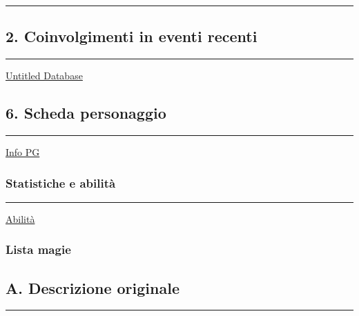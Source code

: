 \begin{center}\rule{0.5\linewidth}{0.5pt}\end{center}

\subsection{2. Coinvolgimenti in eventi
recenti}\label{coinvolgimenti-in-eventi-recenti}

\begin{center}\rule{0.5\linewidth}{0.5pt}\end{center}

\href{Untitled\%20Database\%20f0a0837cffd44ac7a9471133f60c97b8.csv}{Untitled
Database}

\subsection{6. Scheda personaggio}\label{scheda-personaggio}

\begin{center}\rule{0.5\linewidth}{0.5pt}\end{center}

\href{Info\%20PG\%20792973e9c98e424b8fa1da3d1c2eeac4.csv}{Info PG}

\subsubsection{Statistiche e abilità}\label{statistiche-e-abilituxe0}

\begin{center}\rule{0.5\linewidth}{0.5pt}\end{center}

\href{Abilita\%CC\%80\%207db3a6b653ad434187ea54a65d788929.csv}{Abilità}

\subsubsection{Lista magie}\label{lista-magie}

\subsection{A. Descrizione originale}\label{a.-descrizione-originale}

\begin{center}\rule{0.5\linewidth}{0.5pt}\end{center}
